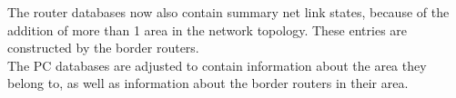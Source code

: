 


The router databases now also contain summary net link states, because of the addition of more than 1 area in the network topology. These entries are constructed by the border routers. \\
The PC databases are adjusted to contain information about the area they belong to, as well as information about the border routers in their area.